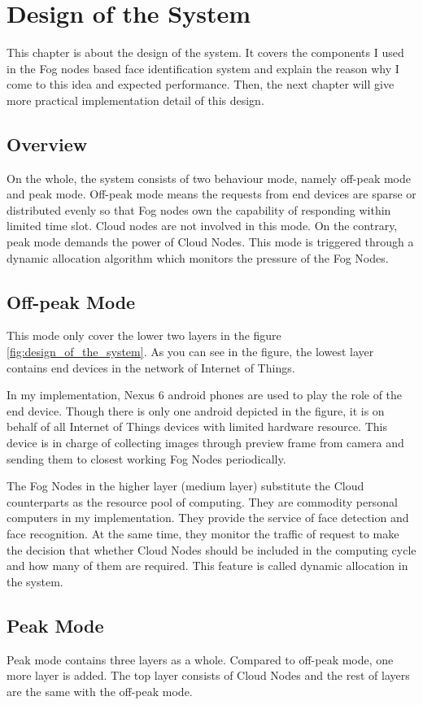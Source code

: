 \chapter{Design of the System} \label{chap:design}
This chapter is about the design of the system. It covers the components I used in the Fog nodes based face identification system and explain the reason why I come to this idea and expected performance. Then, the next chapter will give more practical implementation detail of this design.

\section{Overview}
On the whole, the system consists of two behaviour mode, namely off-peak mode and peak mode. Off-peak mode means the requests from end devices are sparse or distributed evenly so that Fog nodes own the capability of responding within limited time slot. Cloud nodes are not involved in this mode. On the contrary, peak mode demands the power of Cloud Nodes. This mode is triggered through a dynamic allocation algorithm which monitors the pressure of the Fog Nodes.

\section{Off-peak Mode}
This mode only cover the lower two layers in the figure \ref{fig:design_of_the_system}. As you can see in the figure, the lowest layer contains end devices in the network of Internet of Things. 

In my implementation, Nexus 6 android phones are used to play the role of the end device. Though there is only one android depicted in the figure, it is on behalf of all Internet of Things devices with limited hardware resource. This device is in charge of collecting images through preview frame from camera and sending them to closest working Fog Nodes periodically.

The Fog Nodes in the higher layer (medium layer) substitute the Cloud counterparts as the resource pool of computing. They are commodity personal computers in my implementation. They provide the service of face detection and face recognition. At the same time, they monitor the traffic of request to make the decision that whether Cloud Nodes should be included in the computing cycle and how many of them are required. This feature is called dynamic allocation in the system.

\section{Peak Mode}
Peak mode contains three layers as a whole. Compared to off-peak mode, one more layer is added. The top layer consists of Cloud Nodes and the rest of layers are the same with the off-peak mode.

